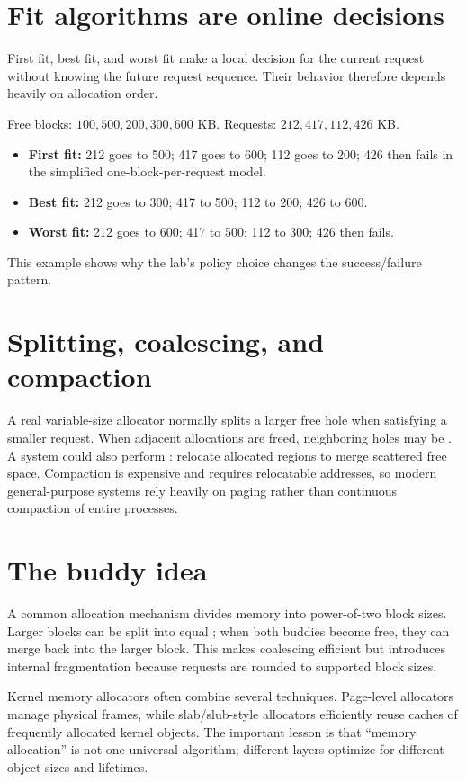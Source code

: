 \section{Fit algorithms are online decisions}
First fit, best fit, and worst fit make a local decision for the current request without knowing the future request sequence. Their behavior therefore depends heavily on allocation order.

\begin{workedexample}
Free blocks: $100,500,200,300,600$ KB. Requests: $212,417,112,426$ KB.
\begin{itemize}
  \item \textbf{First fit:} 212 goes to 500; 417 goes to 600; 112 goes to 200; 426 then fails in the simplified one-block-per-request model.
  \item \textbf{Best fit:} 212 goes to 300; 417 to 500; 112 to 200; 426 to 600.
  \item \textbf{Worst fit:} 212 goes to 600; 417 to 500; 112 to 300; 426 then fails.
\end{itemize}
This example shows why the lab's policy choice changes the success/failure pattern.
\end{workedexample}

\section{Splitting, coalescing, and compaction}
A real variable-size allocator normally splits a larger free hole when satisfying a smaller request. When adjacent allocations are freed, neighboring holes may be . A system could also perform : relocate allocated regions to merge scattered free space. Compaction is expensive and requires relocatable addresses, so modern general-purpose systems rely heavily on paging rather than continuous compaction of entire processes.

\section{The buddy idea}
A common allocation mechanism divides memory into power-of-two block sizes. Larger blocks can be split into equal ; when both buddies become free, they can merge back into the larger block. This makes coalescing efficient but introduces internal fragmentation because requests are rounded to supported block sizes.

\begin{optionaltopic}
Kernel memory allocators often combine several techniques. Page-level allocators manage physical frames, while slab/slub-style allocators efficiently reuse caches of frequently allocated kernel objects. The important lesson is that ``memory allocation'' is not one universal algorithm; different layers optimize for different object sizes and lifetimes.
\end{optionaltopic}

